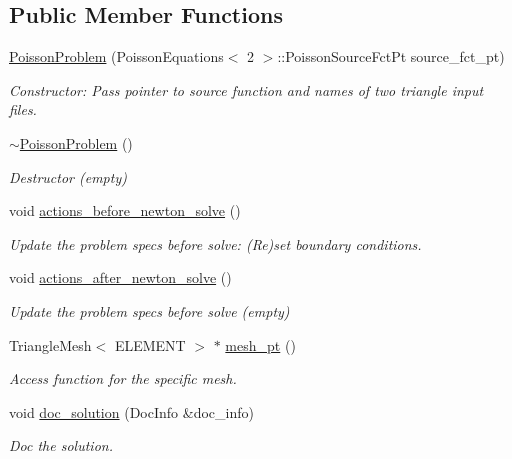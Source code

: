 \subsection*{Public Member Functions}
\begin{DoxyCompactItemize}
\item 
\hyperlink{classPoissonProblem_a9c28346c473d246d8f61022365e742ea}{Poisson\+Problem} (Poisson\+Equations$<$ 2 $>$\+::Poisson\+Source\+Fct\+Pt source\+\_\+fct\+\_\+pt)
\begin{DoxyCompactList}\small\item\em Constructor\+: Pass pointer to source function and names of two triangle input files. \end{DoxyCompactList}\item 
\hyperlink{classPoissonProblem_ac247e42d2d292200617f4b9db7ed1ab8}{$\sim$\+Poisson\+Problem} ()
\begin{DoxyCompactList}\small\item\em Destructor (empty) \end{DoxyCompactList}\item 
void \hyperlink{classPoissonProblem_a398608a5ff73b74c5a387b3f794c58df}{actions\+\_\+before\+\_\+newton\+\_\+solve} ()
\begin{DoxyCompactList}\small\item\em Update the problem specs before solve\+: (Re)set boundary conditions. \end{DoxyCompactList}\item 
void \hyperlink{classPoissonProblem_a7a9478d8e1e5c7d3a886b00ab7d50bbd}{actions\+\_\+after\+\_\+newton\+\_\+solve} ()
\begin{DoxyCompactList}\small\item\em Update the problem specs before solve (empty) \end{DoxyCompactList}\item 
Triangle\+Mesh$<$ E\+L\+E\+M\+E\+NT $>$ $\ast$ \hyperlink{classPoissonProblem_ad428aa9392108f968db64534fc23ba86}{mesh\+\_\+pt} ()
\begin{DoxyCompactList}\small\item\em Access function for the specific mesh. \end{DoxyCompactList}\item 
void \hyperlink{classPoissonProblem_aab6f503fa242f687bb8452527bb7688f}{doc\+\_\+solution} (Doc\+Info \&doc\+\_\+info)
\begin{DoxyCompactList}\small\item\em Doc the solution. \end{DoxyCompactList}\item 

\end{DoxyCompactItemize}
